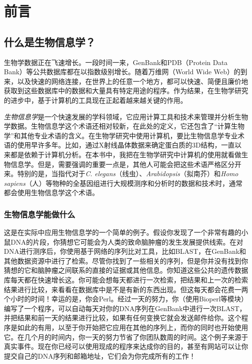 \chapter*{前言}
\minitoc %

\section*{什么是生物信息学？}
生物学数据正在飞速增长。一段时间一来，GenBank和PDB（Protein Data
Bank）等公共数据库都在以指数级别增长。随着万维网（World Wide
Web）的到来，以及快速的网络连接，在世界上的任意一个地方，都可以快速、简便且廉价地获取到这些数据库中的数据和大量具有特定用途的程序。作为结果，在生物学研究的进步中，基于计算机的工具现在正起着越来越关键的作用。

\textit{生物信息学}是一个快速发展的学科领域，它应用计算工具和技术来管理并分析生物学数据。生物信息学这个术语还相对较新，在此处的定义，它还包含了“计算生物学”和其他专业术语的含义。在生物学研究中使用计算机，要比生物信息学专业术语的使用早许多年。比如，通过X射线晶体数据来确定蛋白质的3D结构，一直以来都是依赖于计算机分析。在本书中，我把在生物学研究中计算机的使用就看做生物信息学。但是，需要强调的重要一点是，其他人可能会把这些术语严格区分开来。特别的是，当指代对于\textit{C.  elegans}（线虫）、\textit{Arabidopsis}（拟南芥）和\textit{Homo sapiens}（人）等物种的全基因组进行大规模测序和分析时的数据和技术时，通常都会使用生物信息学这个术语。

\subsection*{生物信息学能做什么}
这是在实际中应用生物信息学的一个简单的例子。假设你发现了一个非常有趣的小鼠DNA的片段，你猜想它可能会为人类的致命脑肿瘤的发生发展提供线索。在对DNA进行测序后，你使用基于网络的序列比对工具，比如BLAST，在GenBank和其他数据资源中进行了检索。尽管你找到了一些相关的序列，但是你并没有找到你猜想的它和脑肿瘤之间联系的直接的证据或其他信息。你知道这些公共的遗传数据库每天都在快速增长这。你可能会想每天都进行一次检索，把结果和上一次的检索结果进行比较，来看看在数据库中是不是有新的东西出现。但这每天都会花费一两个小时的时间！幸运的是，你会Perl。经过一天的努力，你（使用Bioperl等模块）编写了一个程序，可以自动每天对你的DNA序列在GenBank中进行一次BLAST，并把结果和前一天的结果进行比较，如果有任何变换它就会发送邮件给你。这个程序是如此的有用，以至于你开始把它应用在其他的序列上，而你的同时也开始使用它。在几个月的时间内，你一天的努力节省了你团队数周的时间。这个例子来源于真实事件。现在你已经可以使用现成的程序来达成你的目的，甚至有网站可以让你提交自己的DNA序列和邮箱地址，它们会为你完成所有的工作！

